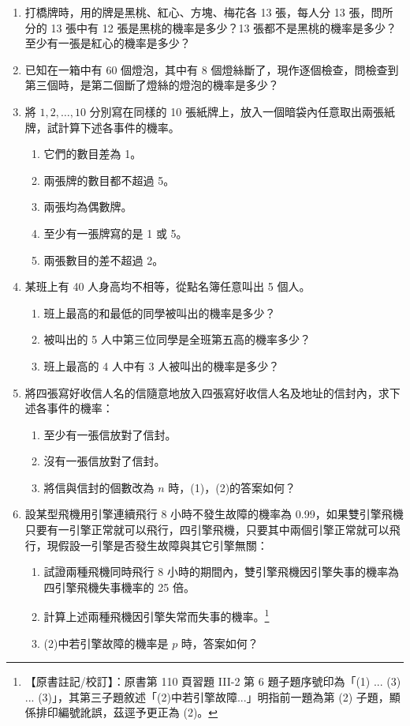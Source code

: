 \begin{enumerate}[label=\textbf{\arabic*.}]
  \item 打橋牌時，用的牌是黑桃、紅心、方塊、梅花各 13 張，每人分 13 張，問所分的 13 張中有 12 張是黑桃的機率是多少？13 張都不是黑桃的機率是多少？至少有一張是紅心的機率是多少？
  \item 已知在一箱中有 60 個燈泡，其中有 8 個燈絲斷了，現作逐個檢查，問檢查到第三個時，是第二個斷了燈絲的燈泡的機率是多少？
  \item 將 $1, 2, \dots, 10$ 分別寫在同樣的 10 張紙牌上，放入一個暗袋內任意取出兩張紙牌，試計算下述各事件的機率。
  \begin{enumerate}[label=(\arabic*)]
    \item 它們的數目差為 1。
    \item 兩張牌的數目都不超過 5。
    \item 兩張均為偶數牌。
    \item 至少有一張牌寫的是 1 或 5。
    \item 兩張數目的差不超過 2。
  \end{enumerate}
  \item 某班上有 40 人身高均不相等，從點名簿任意叫出 5 個人。
  \begin{enumerate}[label=(\arabic*)]
    \item 班上最高的和最低的同學被叫出的機率是多少？
    \item 被叫出的 5 人中第三位同學是全班第五高的機率多少？
    \item 班上最高的 4 人中有 3 人被叫出的機率是多少？
  \end{enumerate}
  \item 將四張寫好收信人名的信隨意地放入四張寫好收信人名及地址的信封內，求下述各事件的機率：
  \begin{enumerate}[label=(\arabic*)]
    \item 至少有一張信放對了信封。
    \item 沒有一張信放對了信封。
    \item 將信與信封的個數改為 $n$ 時，(1)，(2)的答案如何？
  \end{enumerate}
  \item 設某型飛機用引擎連續飛行 8 小時不發生故障的機率為 0.99，如果雙引擎飛機只要有一引擎正常就可以飛行，四引擎飛機，只要其中兩個引擎正常就可以飛行，現假設一引擎是否發生故障與其它引擎無關：
  \begin{enumerate}[label=(\arabic*)]
    \item 試證兩種飛機同時飛行 8 小時的期間內，雙引擎飛機因引擎失事的機率為四引擎飛機失事機率的 25 倍。
    \item 計算上述兩種飛機因引擎失常而失事的機率。\label{note:b5s-ch3-p110-q6-subnum}\footnote{【原書註記/校訂】：原書第 110 頁習題 III-2 第 6 題子題序號印為「(1) ... (3) ... (3)」，其第三子題敘述「(2)中若引擎故障...」明指前一題為第 (2) 子題，顯係排印編號訛誤，茲逕予更正為 (2)。}
    \item (2)中若引擎故障的機率是 $p$ 時，答案如何？
  \end{enumerate}
\end{enumerate}

